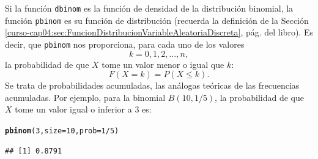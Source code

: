 \documentclass[10pt,a4paper]{article}\usepackage[]{graphicx}\usepackage[]{color}
\makeatletter
\newcommand{\hlnum}[1]{\textcolor[rgb]{0.686,0.059,0.569}{#1}}%
\newcommand{\hlopt}[1]{\textcolor[rgb]{0,0,0}{#1}}%
\newcommand{\hlstd}[1]{\textcolor[rgb]{0.345,0.345,0.345}{#1}}%
\newcommand{\hlkwc}[1]{\textcolor[rgb]{0.333,0.667,0.333}{#1}}%
\newcommand{\hlkwd}[1]{\textcolor[rgb]{0.737,0.353,0.396}{\textbf{#1}}}%
\newenvironment{kframe}{%
 \def\at@end@of@kframe{}%
 \ifinner\ifhmode%
  \def\at@end@of@kframe{\end{minipage}}%
  \begin{minipage}{\columnwidth}%
 \fi\fi%
 \def\FrameCommand##1{\hskip\@totalleftmargin \hskip-\fboxsep
 \colorbox{shadecolor}{##1}\hskip-\fboxsep
     \hskip-\linewidth \hskip-\@totalleftmargin \hskip\columnwidth}%
 \MakeFramed {\advance\hsize-\width
   \@totalleftmargin\z@ \linewidth\hsize
   \@setminipage}}%
 {\par\unskip\endMakeFramed%
 \at@end@of@kframe}
\newenvironment{knitrout}{}{} %
\makeatother
\begin{document}
Si la función {\tt dbinom} es la función de densidad de la distribución binomial, la función {\tt pbinom} es su función de distribución (recuerda la definición de la Sección \ref{curso-cap04:sec:FuncionDistribucionVariableAleatoriaDiscreta}, pág. \pageref{curso-cap04:sec:FuncionDistribucionVariableAleatoriaDiscreta}
del libro). Es decir, que {\tt pbinom} nos proporciona, para cada uno de los valores
\[k=0, 1, 2, \ldots, n,\]
la probabilidad de que $X$ tome un valor menor o igual que $k$:
\[F(X=k)=P(X\leq k).\]
Se trata de probabilidades acumuladas, las análogas teóricas de las frecuencias acumuladas. Por ejemplo, para la binomial $B(10,1/5)$, la probabilidad de que $X$ tome un valor igual o inferior a 3 es:
\begin{knitrout}
\color{fgcolor}\begin{kframe}
\begin{alltt}
\hlkwd{pbinom}\hlstd{(}\hlnum{3}\hlstd{,} \hlkwc{size}\hlstd{=} \hlnum{10}\hlstd{,} \hlkwc{prob}\hlstd{=}\hlnum{1}\hlopt{/}\hlnum{5}\hlstd{)}
\end{alltt}
\begin{verbatim}
## [1] 0.8791
\end{verbatim}
\end{kframe}
\end{knitrout}
\end{document}

